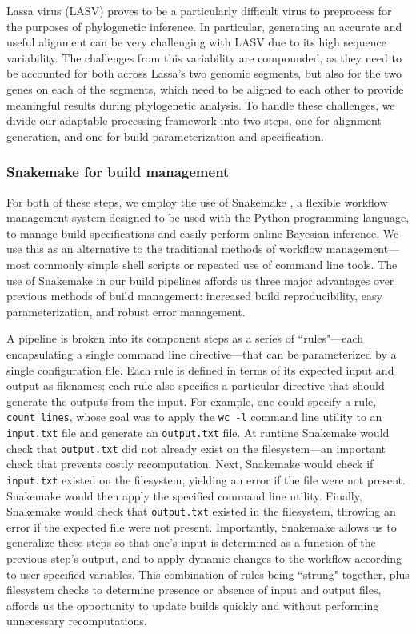 Lassa virus (LASV) proves to be a particularly difficult virus to preprocess for the purposes of phylogenetic inference.
In particular, generating an accurate and useful alignment can be very challenging with LASV due to its high sequence variability.
The challenges from this variability are compounded, as they need to be accounted for both across Lassa's two genomic segments, but also for the two genes on each of the segments, which need to be aligned to each other to provide meaningful results during phylogenetic analysis. %
To handle these challenges, we divide our adaptable processing framework into two steps, one for alignment generation, and one for build parameterization and specification.

\subsubsection{Snakemake for build management}

For both of these steps, we employ the use of Snakemake \cite{snakemake}, a flexible workflow management system designed to be used with the Python programming language, to manage build specifications and easily perform online Bayesian inference.
We use this as an alternative to the traditional methods of workflow management---most commonly simple shell scripts or repeated use of command line tools.
The use of Snakemake in our build pipelines affords us three major advantages over previous methods of build management: increased build reproducibility, easy parameterization, and robust error management.

A pipeline is broken into its component steps as a series of ``rules"---each encapsulating a single command line directive---that can be parameterized by a single configuration file.
Each rule is defined in terms of its expected input and output as filenames; each rule also specifies a particular directive that should generate the outputs from the input.
For example, one could specify a rule, \texttt{count\_lines}, whose goal was to apply the \texttt{wc -l} command line utility to an \texttt{input.txt} file and generate an \texttt{output.txt} file.
At runtime Snakemake would check that \texttt{output.txt} did not already exist on the filesystem---an important check that prevents costly recomputation.
Next, Snakemake would check if \texttt{input.txt} existed on the filesystem, yielding an error if the file were not present.
Snakemake would then apply the specified command line utility.
Finally, Snakemake would check that \texttt{output.txt} existed in the filesystem, throwing an error if the expected file were not present.
Importantly, Snakemake allows us to generalize these steps so that one's input is determined as a function of the previous step's output, and to apply dynamic changes to the workflow according to user specified variables.
This combination of rules being ``strung" together, plus filesystem checks to determine presence or absence of input and output files, affords us the opportunity to update builds quickly and without performing unnecessary recomputations.

